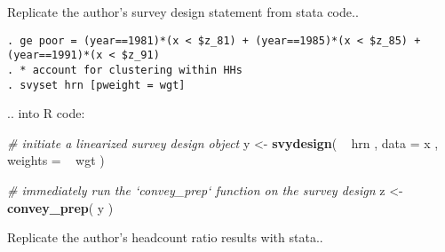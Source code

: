 \documentclass[]{book}
\newenvironment{Shaded}{\begin{snugshade}}{\end{snugshade}}
\newcommand{\KeywordTok}[1]{\textcolor[rgb]{0.13,0.29,0.53}{\textbf{{#1}}}}
\newcommand{\DataTypeTok}[1]{\textcolor[rgb]{0.13,0.29,0.53}{{#1}}}
\newcommand{\StringTok}[1]{\textcolor[rgb]{0.31,0.60,0.02}{{#1}}}
\newcommand{\CommentTok}[1]{\textcolor[rgb]{0.56,0.35,0.01}{\textit{{#1}}}}
\newcommand{\NormalTok}[1]{{#1}}
\begin{document}
Replicate the author's survey design statement from stata code..

\begin{verbatim}
. ge poor = (year==1981)*(x < $z_81) + (year==1985)*(x < $z_85) +  (year==1991)*(x < $z_91)
. * account for clustering within HHs 
. svyset hrn [pweight = wgt]
\end{verbatim}

.. into R code:

\begin{Shaded}
\begin{Highlighting}[]
\CommentTok{# initiate a linearized survey design object}
\NormalTok{y <-}\StringTok{ }\KeywordTok{svydesign}\NormalTok{( ~}\StringTok{ }\NormalTok{hrn , }\DataTypeTok{data =} \NormalTok{x , }\DataTypeTok{weights =} \NormalTok{~}\StringTok{ }\NormalTok{wgt )}

\CommentTok{# immediately run the `convey_prep` function on the survey design}
\NormalTok{z <-}\StringTok{ }\KeywordTok{convey_prep}\NormalTok{( y )}
\end{Highlighting}
\end{Shaded}

Replicate the author's headcount ratio results with stata..
\end{document}
